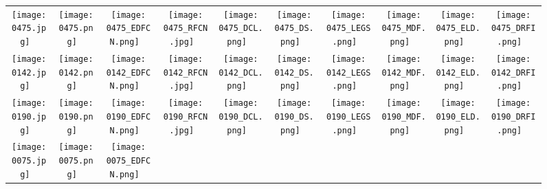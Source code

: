 \documentclass[10pt,twocolumn,letterpaper]{article}
\begin{document}
\begin{figure*}
\begin{tabular}{@{}c@{}c@{}c@{}c@{}c@{}c@{}c@{}c@{}c@{}c}
\texttt{[image: 0475.jpg]} \ &
\texttt{[image: 0475.png]} \ &
\texttt{[image: 0475\_EDFCN.png]} \ &
\texttt{[image: 0475\_RFCN.jpg]} \ &
\texttt{[image: 0475\_DCL.png]} \ &
\texttt{[image: 0475\_DS.png]} \ &
\texttt{[image: 0475\_LEGS.png]} \ &
\texttt{[image: 0475\_MDF.png]} \ &
\texttt{[image: 0475\_ELD.png]} \ &
\texttt{[image: 0475\_DRFI.png]} \ \\
\vspace{-1mm}
\texttt{[image: 0142.jpg]} \ &
\texttt{[image: 0142.png]} \ &
\texttt{[image: 0142\_EDFCN.png]} \ &
\texttt{[image: 0142\_RFCN.jpg]} \ &
\texttt{[image: 0142\_DCL.png]} \ &
\texttt{[image: 0142\_DS.png]} \ &
\texttt{[image: 0142\_LEGS.png]} \ &
\texttt{[image: 0142\_MDF.png]} \ &
\texttt{[image: 0142\_ELD.png]} \ &
\texttt{[image: 0142\_DRFI.png]} \ \\
\vspace{-1mm}
\texttt{[image: 0190.jpg]} \ &
\texttt{[image: 0190.png]} \ &
\texttt{[image: 0190\_EDFCN.png]} \ &
\texttt{[image: 0190\_RFCN.jpg]} \ &
\texttt{[image: 0190\_DCL.png]} \ &
\texttt{[image: 0190\_DS.png]} \ &
\texttt{[image: 0190\_LEGS.png]} \ &
\texttt{[image: 0190\_MDF.png]} \ &
\texttt{[image: 0190\_ELD.png]} \ &
\texttt{[image: 0190\_DRFI.png]} \ \\
\vspace{-1mm}
\texttt{[image: 0075.jpg]} \ &
\texttt{[image: 0075.png]} \ &
\texttt{[image: 0075\_EDFCN.png]} \ &

\end{tabular}
\end{figure*}
\end{document}
